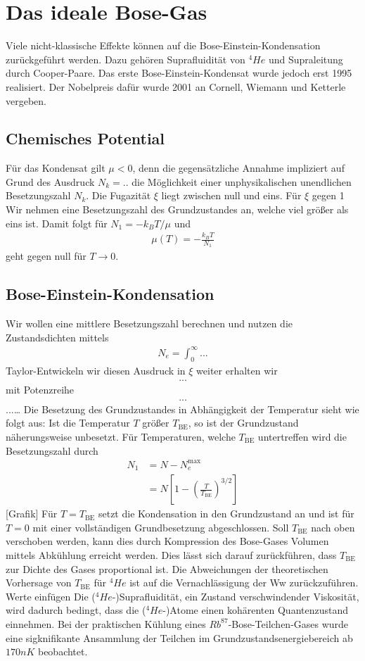 \chapter{Das ideale Bose-Gas}
Viele nicht-klassische Effekte können auf die Bose-Einstein-Kondensation zurückgeführt werden. Dazu gehören Suprafluidität von $^4He$ und Supraleitung durch Cooper-Paare.
Das erste Bose-Einstein-Kondensat wurde jedoch erst 1995 realisiert. Der Nobelpreis dafür wurde 2001 an Cornell, Wiemann und Ketterle vergeben.
\section{Chemisches Potential}
Für das Kondensat gilt $\mu<0$, denn die gegensätzliche Annahme impliziert auf Grund des Ausdruck $N_k=..$ die Möglichkeit einer unphysikalischen unendlichen Besetzungszahl $N_k$.
Die Fugazität $\xi$ liegt zwischen null und eins. Für $\xi$ gegen 1
Wir nehmen eine Besetzungszahl des Grundzustandes an, welche viel größer als eins ist. Damit folgt für $N_1=-k_B T/\mu$ und 
\begin{align*}
    \mu(T)=-\frac{k_B T}{N_1}
\end{align*}
geht gegen null für $T\rightarrow 0$.
\section{Bose-Einstein-Kondensation}
Wir wollen eine mittlere Besetzungszahl berechnen und nutzen die Zustandsdichten mittels
\begin{align*}
    N_e=\int_0^\infty...
\end{align*}
Taylor-Entwickeln wir diesen Ausdruck in $\xi$ weiter erhalten wir 
\begin{align*}
    ...
\end{align*}
mit Potenzreihe
\begin{align*}
    ...
\end{align*}
...\dots
Die Besetzung des Grundzustandes in Abhängigkeit der Temperatur sieht wie folgt aus: Ist die Temperatur $T$ größer $T_\mathrm{BE}$, so ist der Grundzustand näherungsweise unbesetzt. Für Temperaturen, welche $T_\mathrm{BE}$ untertreffen wird die Besetzungszahl durch 
\begin{align*}
    N_1&=N-N_e^\mathrm{max}\\
    &=N\left[1-\left(\frac{T}{T_\mathrm{BE}}\right)^{3/2}\right]
\end{align*}
[Grafik]
Für $T=T_\mathrm{BE}$ setzt die Kondensation in den Grundzustand an und ist für $T=0$ mit einer vollständigen Grundbesetzung abgeschlossen.
Soll $T_\mathrm{BE}$ nach oben verschoben werden, kann dies durch Kompression des Bose-Gases Volumen mittels Abkühlung erreicht werden. Dies lässt sich darauf zurückführen, dass $T_\mathrm{BE}$ zur Dichte des Gases proportional ist.
Die Abweichungen der theoretischen Vorhersage von $T_\mathrm{BE}$ für $^4He$ ist auf die Vernachlässigung der Ww zurückzuführen. Werte einfügen
Die ($^4 He$-)Suprafluidität, ein Zustand verschwindender Viskosität, wird dadurch bedingt, dass die ($^4 He$-)Atome einen kohärenten Quantenzustand einnehmen.
Bei der praktischen Kühlung eines $Rb^{87}$-Bose-Teilchen-Gases wurde eine sigknifikante Ansammlung der Teilchen im Grundzustandsenergiebereich ab $170nK$ beobachtet. 

